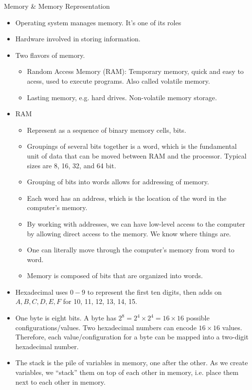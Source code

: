 \documentclass[12pt]{article}
\theoremstyle{plain}
\theoremstyle{definition}
\theoremstyle{remark}
\begin{document}
Memory \& Memory Representation
\begin{itemize}
  \item Operating system manages memory.
    It's one of its roles
  \item Hardware involved in storing information.
  \item Two flavors of memory.
    \begin{itemize}
      \item Random Access Memory (RAM):
        Temporary memory, quick and easy to acess, used to execute
        programs. Also called volatile memory.
      \item Lasting memory, e.g. hard drives.
        Non-volatile memory storage.
    \end{itemize}
  \item RAM
    \begin{itemize}
      \item Represent as a sequence of binary memory cells, bits.
      \item Groupings of several bits together is a word, which is the
        fundamental unit of data that can be moved between
        RAM and the processor.
        Typical sizes are 8, 16, 32, and 64 bit.
      \item Grouping of bits into words allows for addressing of memory.
      \item Each word has an address, which is the location of the word
        in the computer's memory.
      \item By working with addresses, we can have low-level access to
        the computer by allowing direct access to the memory.
        We know where things are.
      \item One can literally move through the computer's memory from
        word to word.
      \item Memory is composed of bits that are organized into words.
    \end{itemize}
  \item Hexadecimal uses $0-9$ to represent the first ten digits, then
    adds on $A,B,C,D,E,F$ for 10, 11, 12, 13, 14, 15.
  \item One byte is eight bits.
    A byte has $2^8=2^4\times 2^4 = 16\times 16$ possible
    configurations/values.
    Two hexadecimal numbers can encode
    $16\times 16$ values.
    Therefore, each value/configuration for a byte can be mapped into a
    two-digit hexadecimal number.
  \item The stack is the pile of variables in memory, one after the
    other.
    As we create variables, we ``stack'' them on top of each other in
    memory, i.e. place them next to each other in memory.
\end{itemize}
\end{document}
